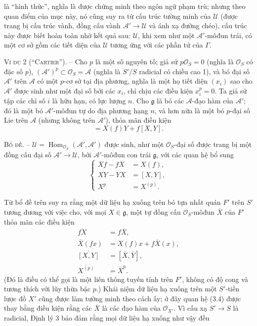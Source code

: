 \documentclass[11pt,twoside,openany]{book}
\numberwithin{equation}{section}
\newcommand{\src}[1]{%
  \phantomsection\hypertarget{src:\fgasourceid:#1}{}%
  \marginpar{\raggedleft\footnotesize\sffamily #1}%
}
\newcommand{\fgasourceid}{unset}
\begin{document}
\src{321}
là ``hình thức'', nghĩa là được chứng minh theo ngôn ngữ phạm trù; nhưng theo
quan điểm của mục này, nó cũng suy ra từ cấu trúc tường minh của $\mathcal U$
(được trang bị cấu trúc vành, đồng cấu vành
$\mathcal A'\longrightarrow\mathcal U$ và ánh xạ đường chéo), cấu trúc này được
biết hoàn toàn nhờ kết quả sau: $\mathcal U$, khi xem như một
$\mathcal A'$-môđun trái, có một cơ sở gồm các tiết diện của $\mathcal U$
tương ứng với các phần tử của $\Gamma$.

\textsc{Ví dụ 2 (``Cartier'').} -- Cho $p$ là một số nguyên tố; giả sử
$p\mathcal O_S=0$ (nghĩa là $\mathcal O_S$ có đặc số $p$),
$(\mathcal A')^p\subset\mathcal O_S=\mathcal A$ (nghĩa là $S'/S$ radicial có
chiều cao 1), và bó đại số $\mathcal A'$ trên $\mathcal A$ có một $p$-cơ sở
tại địa phương, nghĩa là một họ tiết diện $(x_i)$ sao cho $\mathcal A'$ được sinh
như một đại số bởi các $x_i$, chỉ chịu các điều kiện $x_i^p=0$. Ta giả sử tập
các chỉ số $i$ là hữu hạn, có lực lượng $n$. Cho $\mathfrak g$ là bó các
$\mathcal A$-đạo hàm của $\mathcal A'$; đó là một bó $\mathcal A'$-môđun tự do
địa phương hạng $n$, và hơn nữa là một bó $p$-đại số Lie trên $\mathcal A$
(nhưng không trên $\mathcal A'$), thỏa mãn điều kiện
\begin{equation}
  [X,fY]=X(f)Y+f[X,Y].
  \tag{3.5}
\end{equation}

\textsc{Bổ đề.} -- $\mathcal U=
\operatorname{Hom}_{\mathcal O_S}(\mathcal A',\mathcal A')$ được sinh, như một
$\mathcal O_S$-đại số được trang bị một đồng cấu đại số
$\mathcal A'\longrightarrow\mathcal U$, bởi $\mathcal A'$-môđun con trái
$\mathfrak g$, với các quan hệ bổ sung
\begin{equation}
  \left\{
  \begin{aligned}
    Xf-fX&=X(f),\\
    XY-YX&=[X,Y],\\
    X^p&=X^{(p)}.
  \end{aligned}
  \right.
  \tag{3.6}
\end{equation}

Từ bổ đề trên suy ra rằng một dữ liệu hạ xuống trên bó tựa nhất quán $F'$ trên
$S'$ tương đương với việc cho, với mọi $X\in\mathfrak g$, một tự đồng cấu
$\mathcal O_S$-môđun $\overline X$ của $F'$ thỏa mãn các điều kiện
\begin{align}
  \overline{fX}&=f\overline X, \tag{3.7}\\
  \overline X(fx)&=X(f)x+f\overline X(x), \tag{3.8}\\
  \overline{[X,Y]}&=[\overline X,\overline Y], \tag{3.9}\\
  \overline{X^{(p)}}&=\overline X^p. \tag{3.10}
\end{align}
(Đó là điều có thể gọi là một liên thông tuyến tính trên $F'$, không có độ
cong và tương thích với lũy thừa bậc $p$.) Khái niệm dữ liệu hạ xuống trên một
$S'$-tiền lược đồ $X'$ cũng được làm tường minh theo cách ấy; ở đây quan hệ
(3.4) được thay bằng điều kiện rằng các $\overline X$ là các đạo hàm của
$\mathcal O_{X'}$. Vì cấu xạ $S'\longrightarrow S$ là radicial, Định lý 3 bảo
đảm rằng mọi dữ liệu hạ xuống như vậy đều
\end{document}
